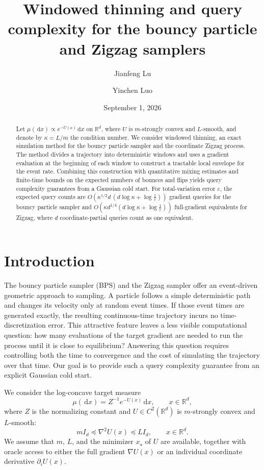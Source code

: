 \documentclass{amsart}
\title[Windowed thinning for BPS and Zigzag]
      {Windowed thinning and query complexity for the bouncy particle and Zigzag samplers}
\author{Jianfeng Lu}
\author{Yinchen Luo}
\date{September 1, 2026}
\theoremstyle{plain}
\theoremstyle{definition}
\theoremstyle{remark}
\newcommand{\ud}{\,\mathrm{d}}
\newcommand{\RR}{\mathbb{R}}
\newcommand{\R}{\RR}
\newcommand{\1}{\mathbf 1}
\newcommand{\dd}{\ud}
\begin{document}
\begin{abstract}
Let $\mu(\dd x)\propto e^{-U(x)}\dd x$ on $\R^d$, where $U$ is $m$-strongly convex and $L$-smooth, and denote by $\kappa=L/m$ the condition number.  We consider windowed thinning, an exact simulation method for the bouncy particle sampler and the coordinate Zigzag process.  The method divides a trajectory into deterministic windows and uses a gradient evaluation at the beginning of each window to construct a tractable local envelope for the event rate.  Combining this construction with quantitative mixing estimates and finite-time bounds on the expected numbers of bounces and flips yields query complexity guarantees from a Gaussian cold start.  For total-variation error $\varepsilon$, the expected query counts are $O(\kappa^{1/2}d\,(d\log\kappa+\log\frac1\varepsilon))$ gradient queries for the bouncy particle sampler and $O(\kappa d^{1/4}(d\log\kappa+\log\frac1\varepsilon))$ full-gradient equivalents for Zigzag, where $d$ coordinate-partial queries count as one equivalent.  
\end{abstract}

\maketitle


\section{Introduction}\label{sec:intro}

The bouncy particle sampler (BPS) and the Zigzag sampler offer an event-driven geometric approach to sampling.  A particle follows a simple deterministic path and changes its velocity only at random event times.  If those event times are generated exactly, the resulting continuous-time trajectory incurs no time-discretization error.  This attractive feature leaves a less visible computational question: how many evaluations of the target gradient are needed to run the process until it is close to equilibrium?  Answering this question requires controlling both the time to convergence and the cost of simulating the trajectory over that time.  Our goal is to provide such a query complexity guarantee from an explicit Gaussian cold start.

We consider the log-concave target measure
\[
        \mu(\dd x)= Z^{-1}e^{-U(x)}\dd x,
        \qquad x\in\R^d,
\]
where $Z$ is the normalizing constant and $U\in C^2(\R^d)$ is
$m$-strongly convex and $L$-smooth:
\begin{equation}\label{eq:hessian-bounds}
        m I_d \preceq \nabla^2 U(x) \preceq L I_d,
        \qquad x\in\R^d.
\end{equation}
We assume that $m$, $L$, and the minimizer $x_\star$ of $U$ are available,
together with oracle access to either the full gradient $\nabla U(x)$ or an
individual coordinate derivative $\partial_iU(x)$.
\end{document}
